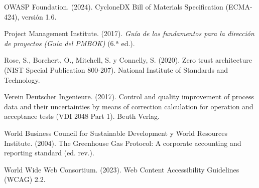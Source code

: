 \documentclass[formulario]{../../comun/overfore}
\begin{document}
\begin{referencias}
\item OWASP Foundation. (2024). CycloneDX Bill of Materials Specification (ECMA-424), versión 1.6.
\item Project Management Institute. (2017). \emph{Guía de los fundamentos para la dirección de proyectos (Guía del PMBOK) }(6.ª ed.).
\item Rose, S., Borchert, O., Mitchell, S. y Connelly, S. (2020). Zero trust architecture (NIST Special Publication 800-207). National Institute of Standards and Technology.
\item Verein Deutscher Ingenieure. (2017). Control and quality improvement of process data and their uncertainties by means of correction calculation for operation and acceptance tests (VDI 2048 Part 1). Beuth Verlag.
\item World Business Council for Sustainable Development y World Resources Institute. (2004). The Greenhouse Gas Protocol: A corporate accounting and reporting standard (ed. rev.).
\item World Wide Web Consortium. (2023). Web Content Accessibility Guidelines (WCAG) 2.2.
\end{referencias}
\end{document}
